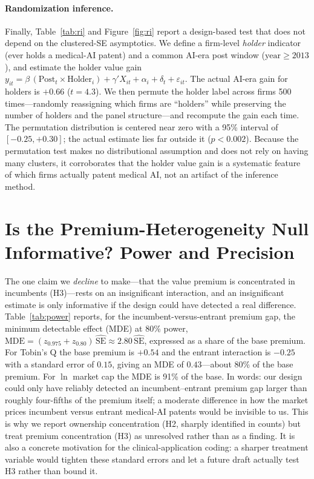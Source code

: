 \documentclass[12pt]{article}
\begin{document}
\paragraph{Randomization inference.} Finally, Table~\ref{tab:ri} and Figure~\ref{fig:ri} report a
design-based test that does not depend on the clustered-SE asymptotics. We define a firm-level
\emph{holder} indicator (ever holds a medical-AI patent) and a common AI-era post window
($\text{year}\geq2013$), and estimate the holder value gain
$y_{it}=\beta\,(\text{Post}_t\times\text{Holder}_i)+\gamma'X_{it}+\alpha_i+\delta_t+\varepsilon_{it}$.
The actual AI-era gain for holders is $+0.66$ ($t=4.3$). We then permute the holder label across
firms 500 times---randomly reassigning which firms are ``holders'' while preserving the number of
holders and the panel structure---and recompute the gain each time. The permutation distribution is
centered near zero with a 95\% interval of $[-0.25,+0.30]$; the actual estimate lies far outside it
($p<0.002$). Because the permutation test makes no distributional assumption and does not rely on
having many clusters, it corroborates that the holder value gain is a systematic feature of which
firms actually patent medical AI, not an artifact of the inference method.

\section{Is the Premium-Heterogeneity Null Informative? Power and Precision}\label{sec:power}
The one claim we \emph{decline} to make---that the value premium is concentrated in incumbents
(H3)---rests on an insignificant interaction, and an insignificant estimate is only informative if
the design could have detected a real difference. Table~\ref{tab:power} reports, for the
incumbent-versus-entrant premium gap, the minimum detectable effect (MDE) at 80\% power,
$\text{MDE}=(z_{0.975}+z_{0.80})\,\widehat{\text{SE}}\approx2.80\,\widehat{\text{SE}}$, expressed
as a share of the base premium. For Tobin's Q the base premium is $+0.54$ and the entrant
interaction is $-0.25$ with a standard error of $0.15$, giving an MDE of $0.43$---about 80\% of the
base premium. For $\ln$ market cap the MDE is 91\% of the base. In words: our design could only have
reliably detected an incumbent--entrant premium gap larger than roughly four-fifths of the premium
itself; a moderate difference in how the market prices incumbent versus entrant medical-AI patents
would be invisible to us. This is why we report ownership concentration (H2, sharply identified in
counts) but treat premium concentration (H3) as unresolved rather than as a finding. It is also a
concrete motivation for the clinical-application coding: a sharper treatment variable would tighten
these standard errors and let a future draft actually test H3 rather than bound it.
\end{document}
